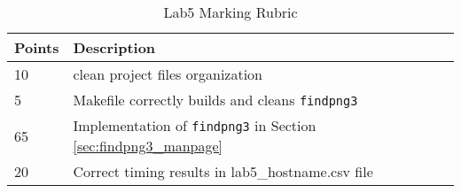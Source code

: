 \begin{table}[ht]
\begin{center}
\begin{tabular}{|p{4cm}|p{10cm}|}
\hline
Points & Description \\ \hline
10     & clean project files organization \\ \hline
 5     & Makefile correctly builds and cleans \verb+findpng3+\\ \hline  
65     & Implementation of \verb+findpng3+ in Section \ref{sec:findpng3_manpage} \\ \hline
20     & Correct timing results in lab5\_hostname.csv file\\ \hline
\end{tabular}
\caption{Lab5 Marking Rubric}
\label{tb_lab5_aio_rubric}
\end{center}
\end{table}

